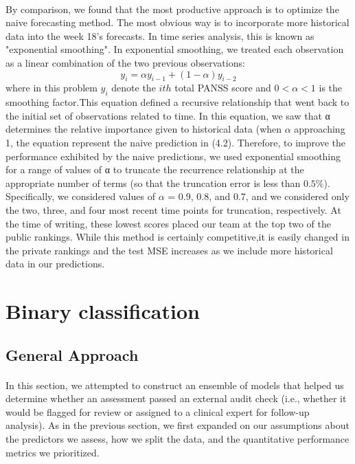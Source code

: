 \documentclass{article}
\begin{document}
	\paragraph{}By comparison, we found that the most productive approach is to optimize the naive forecasting method. The most obvious way is to incorporate more historical data into the week 18's forecasts. In time series analysis, this is known as "exponential smoothing". In exponential smoothing, we treated each observation as a linear combination of the two previous observations:
	\begin{equation}
	  y_i = \alpha y_{i-1}+(1-\alpha)y_{i-2}  
	\end{equation}
where in this problem $y_i$ denote the $ith$ total PANSS score and $ 0<\alpha<1$ is the smoothing factor.This equation defined a recursive relationship that went back to the initial set of observations related to time. In this equation, we saw that α determines the relative importance given to historical data (when $\alpha$ approaching 1, the equation represent the naive prediction in (4.2).
Therefore, to improve the performance exhibited by the naive predictions, we used exponential smoothing for a range of values of α to truncate the recurrence relationship at the appropriate number of terms (so that the truncation error is less than $0.5 \%$). Specifically, we considered values of $\alpha$ = 0.9, 0.8, and 0.7, and we considered only the two, three, and four most recent time points for truncation, respectively. At the time of writing, these lowest scores placed our team at the top two of the public rankings. While this method is certainly competitive,it is easily changed in the private rankings and the test MSE increases as we include more historical data in our predictions.

\section{Binary classification}
	\subsection{General Approach}
	\paragraph{} In this section, we attempted to construct an ensemble of models that helped us determine whether an assessment passed an external audit check (i.e., whether it would be flagged for review or assigned to a clinical expert for follow-up analysis). As in the previous section, we first expanded on our assumptions about the predictors we assess, how we split the data, and the quantitative performance metrics we prioritized.
\end{document}

